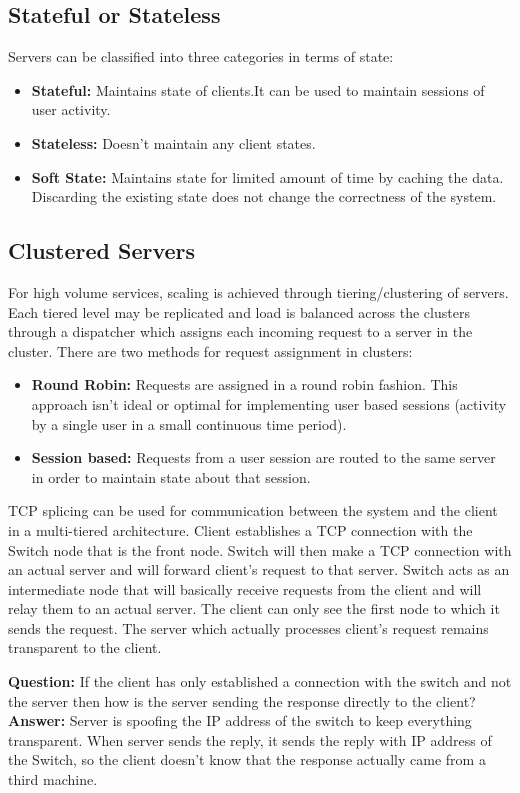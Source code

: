 \documentclass[twoside]{article}
\begin{document}
\subsection{Stateful or Stateless}
Servers can be classified into three categories in terms of state:
\begin{itemize}
    \item \textbf{Stateful:} Maintains state of clients.It can be used to maintain sessions of user activity.
    \item \textbf{Stateless:} Doesn't maintain any client states.
    \item \textbf{Soft State:} Maintains state for limited amount of time by caching the data. Discarding the existing state does not change the correctness of the system.
\end{itemize}

\subsection{Clustered Servers}
For high volume services, scaling is achieved through tiering/clustering of servers. Each tiered level may be replicated and load is balanced across the clusters through a dispatcher which assigns each incoming request to a server in the cluster. There are two methods for request assignment in clusters:
\begin{itemize}
    \item \textbf{Round Robin:} Requests are assigned in a round robin fashion. This approach isn't ideal or optimal for implementing user based sessions (activity by a single user in a small continuous time period).
    \item \textbf{Session based:} Requests from a user session are routed to the same server in order to maintain state about that session.
\end{itemize}

TCP splicing can be used for communication between the system and the client in a multi-tiered architecture. Client establishes a TCP connection with the Switch node that is the front node. Switch will then make a TCP connection with an actual server and will forward client's request to that server. Switch acts as an intermediate node that will basically receive requests from the client and will relay them to an actual server. The client can only see the first node to which it sends the request. The server which actually processes client's request remains transparent to the client. 

\textbf{Question:} If the client has only established a connection with the switch and not the server then how is the server sending the response directly to the client?
\\ \textbf{Answer:} Server is spoofing the IP address of the switch to keep everything transparent. When server sends the reply, it sends the reply with IP address of the Switch, so the client doesn't know that the response actually came from a third machine. 
\end{document}
